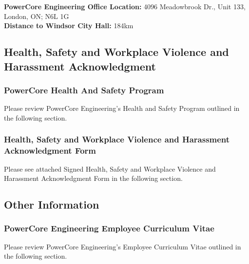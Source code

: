 \noindent\textbf{PowerCore Engineering Office Location:} \textcolor[rgb]{0,0,0}{\textcolor[rgb]{0,0,1}{4096 Meadowbrook Dr., Unit 133, London, ON;  N6L 1G}}\\
\noindent\textbf{Distance to Windsor City Hall:} \textcolor[rgb]{0,0,1}{184km}\\

 
\pagebreak

\subsection{Health, Safety and Workplace Violence and Harassment Acknowledgment}
\label{Sub:HS}

\subsubsection{PowerCore Health And Safety Program}
\label{Sub:HS:HSP}

Please review PowerCore Engineering's Health and Safety Program outlined in the following section. 



\subsubsection{Health, Safety and Workplace Violence and Harassment Acknowledgment Form}
\label{Sub:HS:sig}

Please see attached Signed Health, Safety and Workplace Violence and Harassment Acknowledgment Form in the following section. 



\pagebreak
\subsection{Other Information}
\label{Sub:OI}

\subsubsection{PowerCore Engineering Employee Curriculum Vitae}
\label{Sub:OI:CVs}

Please review PowerCore Engineering's Employee Curriculum Vitae outlined in the following section.



